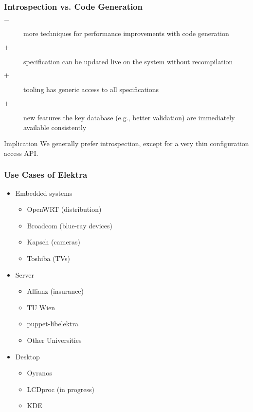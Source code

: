 \begin{frame}
	\frametitle{Introspection vs. Code Generation}

	\begin{description}
	\item[$-$] more techniques for performance improvements with code generation
	\item[$+$] specification can be updated live on the system without recompilation
	\item[$+$] tooling has generic access to all specifications
 	\item[$+$] new features the key database (e.g., better validation) are immediately available consistently
	\end{description}

	\vspace{0.5em}

	\begin{alertblock}{Implication}
	We generally prefer introspection, except for a very thin configuration access API.
	\end{alertblock}
\end{frame}


\begin{frame}
	\frametitle{Use Cases of Elektra}
	\begin{itemize}[<+->]
	\item Embedded systems
	\begin{itemize}
	\item OpenWRT (distribution)
	\item Broadcom (blue-ray devices)
	\item Kapsch (cameras)
	\item Toshiba (TVs)
	\end{itemize}
	\item Server
	\begin{itemize}
	\item Allianz (insurance)
	\item TU Wien
	\item puppet-libelektra
	\item Other Universities
	\end{itemize}
	\item Desktop
	\begin{itemize}
	\item Oyranos
	\item LCDproc (in progress)
	\item KDE
	\end{itemize}
	\end{itemize}
\end{frame}

